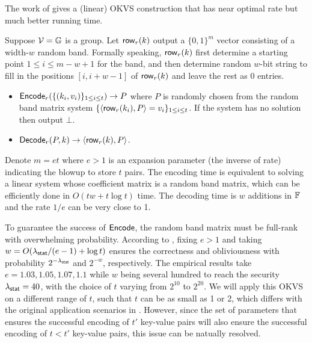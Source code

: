 The work of \cite{cryptoeprint:2023/903} gives a (linear) OKVS construction that has near optimal rate but much better running time. 

\begin{construction}\label{con:OKVS_ribbon}
  Suppose $\mathcal{V} = \mathbb{G}$ is a group. Let ${\sf row}_r(k)$ output a $\{0,1\}^m$ vector consisting of a width-$w$ random band. Formally speaking, ${\sf row}_r(k)$ first determine a starting point $1\le i\le m-w+1$ for the band, and then determine random $w$-bit string to fill in the positions $[i,i+w-1]$ of ${\sf row}_r(k)$ and leave the rest as 0 entries. 
  \begin{itemize}
    \item ${\sf Encode}_r(\{(k_i,v_i)\}_{1\le i\le t})\rightarrow P$ where $P$ is randomly chosen from the random band matrix system $\{\langle {\sf row}_r(k_i), P \rangle=v_i\}_{1\le i\le t}$. If the system has no solution then output $\bot$. 
    \item ${\sf Decode}_r(P,k)\rightarrow \langle {\sf row}_r(k), P \rangle$. 
  \end{itemize}
  
\end{construction}

Denote $m=et$ where $e>1$ is an expansion parameter (the inverse of rate) indicating the blowup to store $t$ pairs. The encoding time is equivalent to solving a linear system whose coefficient matrix is a random band matrix, which can be efficiently done in $O(tw+t\log t)$ time. The decoding time is $w$ additions in $\mathbb{F}$ and the rate $1/e$ can be very close to 1. 

To guarantee the success of ${\sf Encode}$, the random band matrix must be full-rank with overwhelming probability. According to \cite{cryptoeprint:2023/903}, fixing $e>1$ and taking $w = O(\lambda_{\sf stat}/(e-1)+\log t)$ ensures the correctness and obliviousness with probability $2^{-\lambda_{\sf stat}}$ and $2^{-w}$, respectively. The empirical results take $e=1.03,1.05,1.07,1.1$ while $w$ being several hundred to reach the security $\lambda_{\sf stat}=40$, with the choice of $t$ varying from $2^{10}$ to $2^{20}$. We will apply this OKVS on a different range of $t$, such that $t$ can be as small as 1 or 2, which differs with the original application scenarios in \cite{cryptoeprint:2023/903}. However, since the set of parameters that ensures the successful encoding of $t'$ key-value pairs will also ensure the successful encoding of $t<t'$ key-value pairs, this issue can be natually resolved. %

